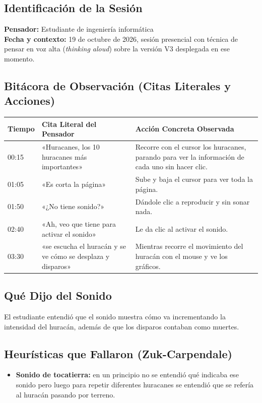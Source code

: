 \documentclass[11pt,a4paper]{article}
\begin{document}
	\subsection{Identificación de la Sesión}
	\textbf{Pensador:} Estudiante de ingeniería informática\\
	\textbf{Fecha y contexto:} 19 de octubre de 2026, sesión presencial con técnica de pensar en voz alta (\textit{thinking aloud}) sobre la versión V3 desplegada en ese momento.
	
	\subsection{Bitácora de Observación (Citas Literales y Acciones)}
	\begin{center}
		\small
		\begin{tabularx}{\textwidth}{lp{6.8cm}X}
			\toprule
			\textbf{Tiempo} & \textbf{Cita Literal del Pensador} & \textbf{Acción Concreta Observada} \\
			\midrule
			00:15 & «Huracanes, los 10 huracanes más importantes» & Recorre con el cursor los huracanes, parando para ver la información de cada uno sin hacer clic. \\
			01:05 & «Es corta la página» & Sube y baja el cursor para ver toda la página. \\
			01:50 & «¿No tiene sonido?» & Dándole clic a reproducir y sin sonar nada. \\
			02:40 & «Ah, veo que tiene para activar el sonido» & Le da clic al activar el sonido. \\
			03:30 & «se escucha el huracán y se ve cómo se desplaza y disparos» & Mientras recorre el movimiento del huracán con el mouse y ve los gráficos. \\
			\bottomrule
		\end{tabularx}
	\end{center}
	
	\subsection{Qué Dijo del Sonido}
	El estudiante entendió que el sonido muestra cómo va incrementando la intensidad del huracán, además de que los disparos contaban como muertes.
	
	\subsection{Heurísticas que Fallaron (Zuk-Carpendale)}
	\begin{itemize}
		\item \textbf{Sonido de tocatierra:} en un principio no se entendió qué indicaba ese sonido pero luego para repetir diferentes huracanes se entendió que se refería al huracán pasando por terreno.
	\end{itemize}
	
\end{document}
